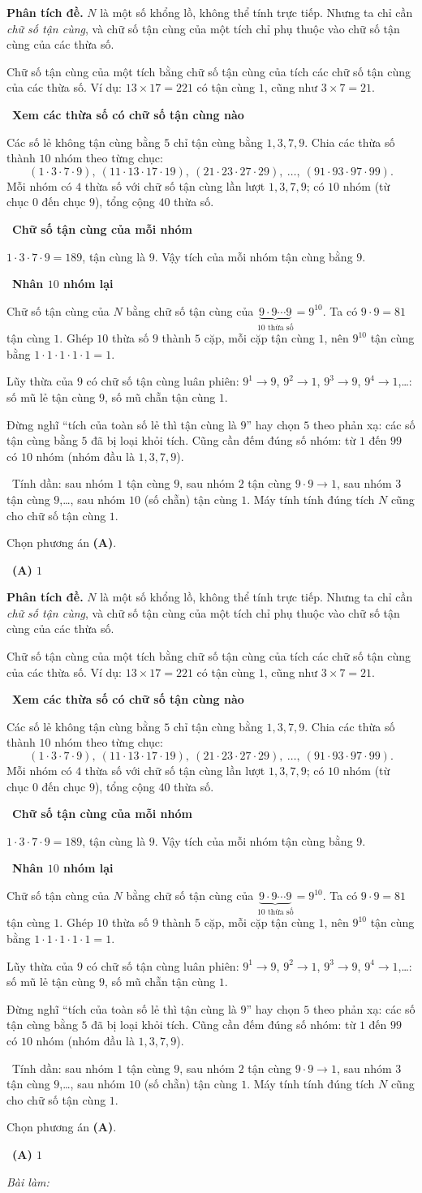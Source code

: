 \documentclass[11pt]{article}
\newif\ifsol \soltrue
\providecommand{\AnsWord}{Đáp số}
\newcommand{\ans}[1]{\par\smallskip{\bfseries\color{tmGreen!88!black}\AnsWord:}\ {\bfseries\color{AnsRed}#1}\par}
\newcommand{\probsol}[1]{%
  \begin{lrbox}{\solmeasure}\begin{minipage}{\dimexpr\linewidth-24pt\relax}#1\end{minipage}\end{lrbox}%
  \ifsol
    \begin{solbox}#1\end{solbox}%
  \else
    \setlength{\solht}{\dimexpr\ht\solmeasure+\dp\solmeasure+0.85cm\relax}%
    \ifdim\solht<1.35cm\setlength{\solht}{1.35cm}\fi
    \ifdim\solht>\StudentMaxWork\setlength{\solht}{\StudentMaxWork}\fi
    \begin{tcolorbox}[colback=white,colframe=Line,boxrule=0.8pt,arc=5pt,
      left=8pt,right=8pt,top=4pt,bottom=4pt,height=\solht]{\footnotesize\color{Slate}\itshape\WorkWord}\end{tcolorbox}%
  \fi}
\newlength{\StudentMaxWork}\setlength{\StudentMaxWork}{7.5cm}
\newcommand{\step}[2]{\par\smallskip\noindent{\bfseries\color{tmBlue!85!black}\StepWord~#1.}\ {\bfseries #2}\par\nopagebreak}
\newcommand{\verify}[1]{\par\smallskip\noindent{\bfseries\color{tmGreen!80!black}\faCheckCircle\ \CheckWord}\ #1\par}
\def\WorkWord{Bài làm:}
\def\AnsWord{Đáp số}
\def\StepWord{Bước}
\def\CheckWord{Thử lại:}
\begin{document}
\probsol{
\textbf{Phân tích đề.} $N$ là một số khổng lồ, không thể tính trực tiếp. Nhưng ta chỉ cần \emph{chữ số tận cùng}, và chữ số tận cùng của một tích chỉ phụ thuộc vào chữ số tận cùng của các thừa số.

\begin{recallbox}Chữ số tận cùng của một tích bằng chữ số tận cùng của tích các chữ số tận cùng của các thừa số. Ví dụ: $13\times 17=221$ có tận cùng $1$, cũng như $3\times 7=21$.\end{recallbox}

\step{1}{Xem các thừa số có chữ số tận cùng nào}
Các số lẻ không tận cùng bằng $5$ chỉ tận cùng bằng $1,3,7,9$. Chia các thừa số thành $10$ nhóm theo từng chục:
\[(1\cdot3\cdot7\cdot9),\ (11\cdot13\cdot17\cdot19),\ (21\cdot23\cdot27\cdot29),\ \dots,\ (91\cdot93\cdot97\cdot99).\]
Mỗi nhóm có $4$ thừa số với chữ số tận cùng lần lượt $1,3,7,9$; có $10$ nhóm (từ chục $0$ đến chục $9$), tổng cộng $40$ thừa số.

\step{2}{Chữ số tận cùng của mỗi nhóm}
$1\cdot3\cdot7\cdot9=189$, tận cùng là $9$. Vậy tích của mỗi nhóm tận cùng bằng $9$.

\step{3}{Nhân $10$ nhóm lại}
Chữ số tận cùng của $N$ bằng chữ số tận cùng của $\underbrace{9\cdot 9\cdots 9}_{10\text{ thừa số}}=9^{10}$. Ta có $9\cdot 9=81$ tận cùng $1$. Ghép $10$ thừa số $9$ thành $5$ cặp, mỗi cặp tận cùng $1$, nên $9^{10}$ tận cùng bằng $1\cdot1\cdot1\cdot1\cdot1=1$.

\begin{tipbox}Lũy thừa của $9$ có chữ số tận cùng luân phiên: $9^1\to 9$, $9^2\to 1$, $9^3\to 9$, $9^4\to 1$,\dots: số mũ lẻ tận cùng $9$, số mũ chẵn tận cùng $1$.\end{tipbox}

\begin{warnbox}Đừng nghĩ ``tích của toàn số lẻ thì tận cùng là $9$'' hay chọn $5$ theo phản xạ: các số tận cùng bằng $5$ đã bị loại khỏi tích. Cũng cần đếm đúng số nhóm: từ $1$ đến $99$ có $10$ nhóm (nhóm đầu là $1,3,7,9$).\end{warnbox}

\verify{Tính dần: sau nhóm $1$ tận cùng $9$, sau nhóm $2$ tận cùng $9\cdot9\to1$, sau nhóm $3$ tận cùng $9$,\dots, sau nhóm $10$ (số chẵn) tận cùng $1$. Máy tính tính đúng tích $N$ cũng cho chữ số tận cùng $1$.}
Chọn phương án \textbf{(A)}.
\ans{(A) $1$}
}
\end{document}
